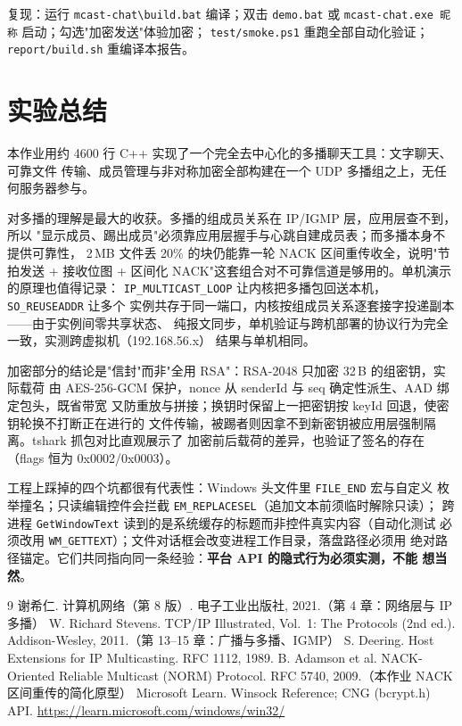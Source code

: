 \documentclass[11pt,a4paper,fontset=fandol]{ctexart}
\begin{document}
\noindent 复现：运行 \texttt{mcast-chat\textbackslash build.bat} 编译；双击
\texttt{demo.bat} 或 \texttt{mcast-chat.exe 昵称} 启动；勾选"加密发送"体验加密；
\texttt{test/smoke.ps1} 重跑全部自动化验证；\texttt{report/build.sh} 重编译本报告。

\section{实验总结}

本作业用约 4600 行 C++ 实现了一个完全去中心化的多播聊天工具：文字聊天、可靠文件
传输、成员管理与非对称加密全部构建在一个 UDP 多播组之上，无任何服务器参与。

对多播的理解是最大的收获。多播的组成员关系在 IP/IGMP 层，应用层查不到，所以
"显示成员、踢出成员"必须靠应用层握手与心跳自建成员表；而多播本身不提供可靠性，
2\,MB 文件丢 20\% 的块仍能靠一轮 NACK 区间重传收全，说明"节拍发送 + 接收位图 +
区间化 NACK"这套组合对不可靠信道是够用的。单机演示的原理也值得记录：
\texttt{IP\_MULTICAST\_LOOP} 让内核把多播包回送本机，\texttt{SO\_REUSEADDR} 让多个
实例共存于同一端口，内核按组成员关系逐套接字投递副本——由于实例间零共享状态、
纯报文同步，单机验证与跨机部署的协议行为完全一致，实测跨虚拟机（192.168.56.x）
结果与单机相同。

加密部分的结论是"信封"而非"全用 RSA"：RSA-2048 只加密 32\,B 的组密钥，实际载荷
由 AES-256-GCM 保护，nonce 从 senderId 与 seq 确定性派生、AAD 绑定包头，既省带宽
又防重放与拼接；换钥时保留上一把密钥按 keyId 回退，使密钥轮换不打断正在进行的
文件传输，被踢者则因拿不到新密钥被应用层强制隔离。tshark 抓包对比直观展示了
加密前后载荷的差异，也验证了签名的存在（flags 恒为 0x0002/0x0003）。

工程上踩掉的四个坑都很有代表性：Windows 头文件里 \texttt{FILE\_END} 宏与自定义
枚举撞名；只读编辑控件会拦截 \texttt{EM\_REPLACESEL}（追加文本前须临时解除只读）；
跨进程 \texttt{GetWindowText} 读到的是系统缓存的标题而非控件真实内容（自动化测试
必须改用 \texttt{WM\_GETTEXT}）；文件对话框会改变进程工作目录，落盘路径必须用
绝对路径锚定。它们共同指向同一条经验：\textbf{平台 API 的隐式行为必须实测，不能
想当然}。

\begin{thebibliography}{9}
 谢希仁. 计算机网络（第 8 版）. 电子工业出版社, 2021.（第 4 章：网络层与 IP 多播）
 W. Richard Stevens. TCP/IP Illustrated, Vol.~1: The Protocols (2nd ed.). Addison-Wesley, 2011.（第 13--15 章：广播与多播、IGMP）
 S. Deering. Host Extensions for IP Multicasting. RFC 1112, 1989.
 B. Adamson et al. NACK-Oriented Reliable Multicast (NORM) Protocol. RFC 5740, 2009.（本作业 NACK 区间重传的简化原型）
 Microsoft Learn. Winsock Reference; CNG (bcrypt.h) API. \url{https://learn.microsoft.com/windows/win32/}
\end{thebibliography}
\end{document}
